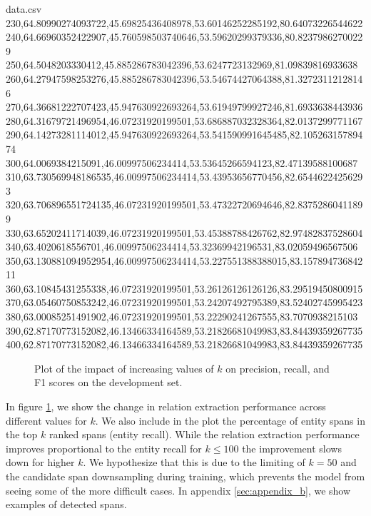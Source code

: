 \documentclass[11pt]{article}
\begin{document}
\begin{filecontents*}{data.csv}
230,64.80990274093722,45.69825436408978,53.60146252285192,80.64073226544622
240,64.66960352422907,45.760598503740646,53.59620299379336,80.82379862700229
250,64.5048203330412,45.885286783042396,53.6247723132969,81.09839816933638
260,64.27947598253276,45.885286783042396,53.54674427064388,81.32723112128146
270,64.36681222707423,45.947630922693264,53.61949799927246,81.6933638443936
280,64.31679721496954,46.07231920199501,53.686887032328364,82.0137299771167
290,64.14273281114012,45.947630922693264,53.541590991645485,82.10526315789474
300,64.0069384215091,46.00997506234414,53.53645266594123,82.47139588100687
310,63.730569948186535,46.00997506234414,53.43953656770456,82.65446224256293
320,63.706896551724135,46.07231920199501,53.47322720694646,82.83752860411899
330,63.65202411714039,46.07231920199501,53.45388788426762,82.97482837528604
340,63.4020618556701,46.00997506234414,53.32369942196531,83.02059496567506
350,63.130881094952954,46.00997506234414,53.227551388388015,83.15789473684211
360,63.10845431255338,46.07231920199501,53.26126126126126,83.29519450800915
370,63.05460750853242,46.07231920199501,53.24207492795389,83.52402745995423
380,63.00085251491902,46.07231920199501,53.22290241267555,83.7070938215103
390,62.87170773152082,46.13466334164589,53.21826681049983,83.84439359267735
400,62.87170773152082,46.13466334164589,53.21826681049983,83.84439359267735
\end{filecontents*}

\begin{figure}
    \centering
    \caption{Plot of the impact of increasing values of $k$ on precision, recall, and F1 scores on the development set.}
    \label{fig:k_rel}
\end{figure}

In figure \ref{fig:k_rel}, we show the change in relation extraction performance across different values for $k$.
We also include in the plot the percentage of entity spans in the top $k$ ranked spans (entity recall).
While the relation extraction performance improves proportional to the entity recall for $k \leq 100$ the improvement slows down for higher $k$.
We hypothesize that this is due to the limiting of $k=50$ and the candidate span downsampling during training, which prevents the model from seeing some of the more difficult cases.
In appendix \ref{sec:appendix_b}, we show examples of detected spans.
\end{document}

